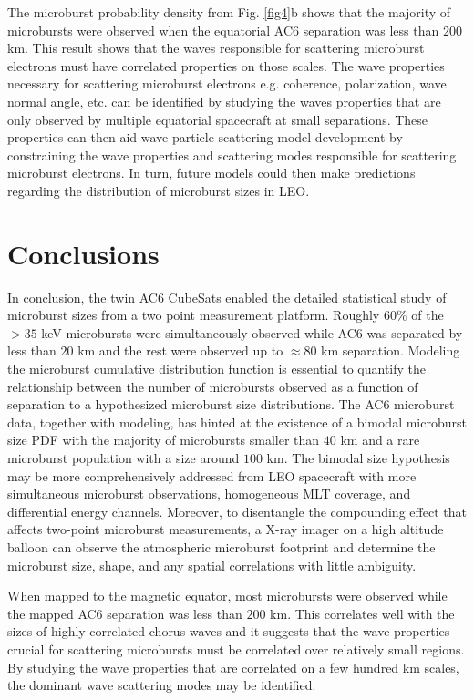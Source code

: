 \documentclass[draft]{agujournal2019}
\begin{document}
The microburst probability density from Fig. \ref{fig4}b shows that the majority of microbursts were observed when the equatorial AC6 separation was less than $200$ km. This result shows that the waves responsible for scattering microburst electrons must have correlated properties on those scales. The wave properties necessary for scattering microburst electrons e.g. coherence, polarization, wave normal angle, etc. can be identified by studying the waves properties that are only observed by multiple equatorial spacecraft at small separations. These properties can then aid wave-particle scattering model development by constraining the wave properties and scattering modes responsible for scattering microburst electrons. In turn, future models could then make predictions regarding the distribution of microburst sizes in LEO. 

\section{Conclusions}
In conclusion, the twin AC6 CubeSats enabled the detailed statistical study of microburst sizes from a two point measurement platform. Roughly $60 \%$ of the $> 35$ keV microbursts were simultaneously observed while AC6 was separated by less than $20$ km and the rest were observed up to $\approx 80$ km separation. Modeling the microburst cumulative distribution function is essential to quantify the relationship between the number of microbursts observed as a function of separation to a hypothesized microburst size distributions. The AC6 microburst data, together with modeling, has hinted at the existence of a bimodal microburst size PDF with the majority of microbursts smaller than $40$ km and a rare microburst population with a size around $100$ km. The bimodal size hypothesis may be more comprehensively addressed from LEO spacecraft with more simultaneous microburst observations, homogeneous MLT coverage, and differential energy channels. Moreover, to disentangle the compounding effect that affects two-point microburst measurements, a X-ray imager on a high altitude balloon can observe the atmospheric microburst footprint and determine the microburst size, shape, and any spatial correlations with little ambiguity. 

When mapped to the magnetic equator, most microbursts were observed while the mapped AC6 separation was less than $200$ km. This correlates well with the sizes of highly correlated chorus waves and it suggests that the wave properties crucial for scattering microbursts must be correlated over relatively small regions. By studying the wave properties that are correlated on a few hundred km scales, the dominant wave scattering modes may be identified.
\end{document}
